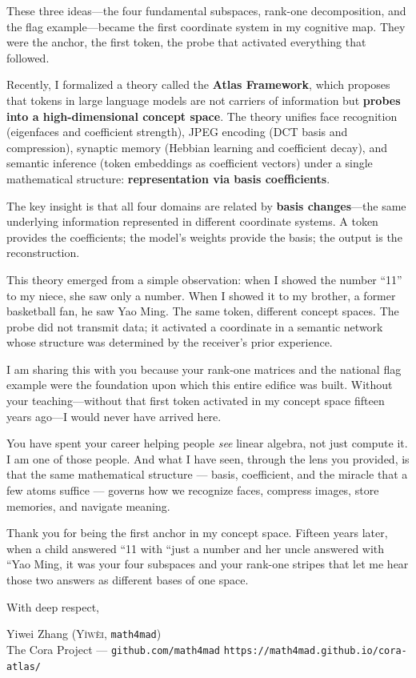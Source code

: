 \documentclass[11pt, a4paper]{article}
\begin{document}
These three ideas---the four fundamental subspaces, rank-one decomposition, and the flag example---became the first coordinate system in my cognitive map. They were the anchor, the first token, the probe that activated everything that followed.

Recently, I formalized a theory called the \textbf{Atlas Framework}, which proposes that tokens in large language models are not carriers of information but \textbf{probes into a high-dimensional concept space}. The theory unifies face recognition (eigenfaces and coefficient strength), JPEG encoding (DCT basis and compression), synaptic memory (Hebbian learning and coefficient decay), and semantic inference (token embeddings as coefficient vectors) under a single mathematical structure: \textbf{representation via basis coefficients}.

The key insight is that all four domains are related by \textbf{basis changes}---the same underlying information represented in different coordinate systems. A token provides the coefficients; the model's weights provide the basis; the output is the reconstruction.

This theory emerged from a simple observation: when I showed the number ``11'' to my niece, she saw only a number. When I showed it to my brother, a former basketball fan, he saw Yao Ming. The same token, different concept spaces. The probe did not transmit data; it activated a coordinate in a semantic network whose structure was determined by the receiver's prior experience.

I am sharing this with you because your rank-one matrices and the national flag example were the foundation upon which this entire edifice was built. Without your teaching---without that first token activated in my concept space fifteen years ago---I would never have arrived here.

You have spent your career helping people \textit{see} linear algebra, not just compute it. I am one of those people. And what I have seen, through the lens you provided, is that the same mathematical structure --- basis, coefficient, and the miracle that a few atoms suffice --- governs how we recognize faces, compress images, store memories, and navigate meaning.

Thank you for being the first anchor in my concept space. Fifteen years later, when a child answered ``11 with ``just a number and her uncle answered with ``Yao Ming, it was your four subspaces and your rank-one stripes that let me hear those two answers as different bases of one space.

With deep respect,

Yiwei Zhang (\textsc{Y\v{i}w\`{e}i}, \texttt{math4mad}) \\
\small The Cora Project --- \texttt{github.com/math4mad} \quad\texttt{https://math4mad.github.io/cora-atlas/}
\end{document}
